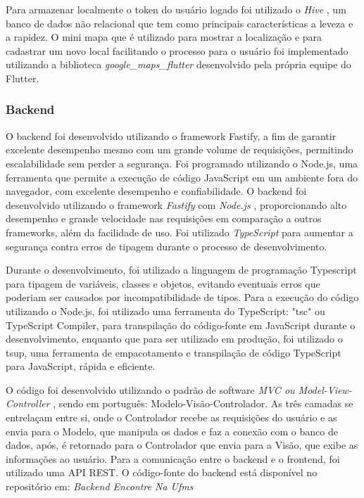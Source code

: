     Para armazenar localmente o token do usuário logado foi utilizado o \textit{Hive} \cite{hive}, um banco de dados não relacional que tem como principais características a leveza e a rapidez. O mini mapa que é utilizado para mostrar a localização e para cadastrar um novo local facilitando o processo para o usuário foi implementado utilizando a biblioteca \textit{google\_maps\_flutter} \cite{googlemapsflutter} desenvolvido pela própria equipe do Flutter. 

\subsubsection{Backend}

    O backend foi desenvolvido utilizando o framework Fastify, a fim de garantir excelente desempenho mesmo com um grande volume de requisições, permitindo escalabilidade sem perder a segurança. Foi programado utilizando o Node.js, uma ferramenta que permite a execução de código JavaScript em um ambiente fora do navegador, com excelente desempenho e confiabilidade.
    O backend foi desenvolvido utilizando o framework \textit{Fastify} \cite{fastify} com \textit{Node.js} \cite{nodejs}, proporcionando alto desempenho e grande velocidade nas requisições em comparação a outros frameworks, além da facilidade de uso. Foi utilizado \textit{TypeScript} \cite{typescript} para aumentar a segurança contra erros de tipagem durante o processo de desenvolvimento.
    
    Durante o desenvolvimento, foi utilizado a linguagem de programação Typescript para tipagem de variáveis, classes e objetos, evitando eventuais erros que poderiam ser causados por incompatibilidade de tipos. Para a execução do código utilizando o Node.js, foi utilizado uma ferramenta do TypeScript: "tsc" ou TypeScript Compiler, para transpilação do código-fonte em JavaScript durante o desenvolvimento, enquanto que para ser utilizado em produção, foi utilizado o tsup, uma ferramenta de empacotamento e transpilação de código TypeScript para JavaScript, rápida e eficiente.

    O código foi desenvolvido utilizando o padrão de software \textit{MVC ou Model-View-Controller} \cite{mvc}, sendo em português: Modelo-Visão-Controlador. As três camadas se entrelaçam entre si, onde o Controlador recebe as requisições do usuário e as envia para o Modelo, que manipula os dados e faz a conexão com o banco de dados, após, é retornado para o Controlador que envia para a Visão, que exibe as informações ao usuário. Para a comunicação entre o backend e o frontend, foi utilizado uma API REST. O código-fonte do backend está disponível no repositório em: \textit{Backend Encontre Na Ufms} \cite{backend}

